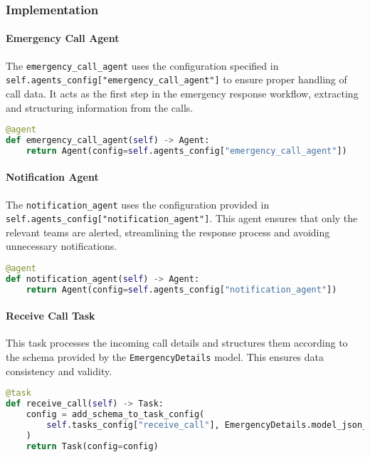 \subsubsection{Implementation}

\paragraph{Emergency Call Agent}
The \texttt{emergency\_call\_agent} uses the configuration specified in \newline \texttt{self.agents\_config["emergency\_call\_agent"]} to ensure proper handling of call data. It acts as the first step in the emergency response workflow, extracting and structuring information from the calls.

\begin{lstlisting}[language=Python]
@agent
def emergency_call_agent(self) -> Agent:
    return Agent(config=self.agents_config["emergency_call_agent"])
\end{lstlisting}

\paragraph{Notification Agent}
The \texttt{notification\_agent} uses the configuration provided in \newline \texttt{self.agents\_config["notification\_agent"]}. This agent ensures that only the relevant teams are alerted, streamlining the response process and avoiding unnecessary notifications.

\begin{lstlisting}[language=Python]
@agent
def notification_agent(self) -> Agent:
    return Agent(config=self.agents_config["notification_agent"])
\end{lstlisting}


\paragraph{Receive Call Task}
This task processes the incoming call details and structures them according to the schema provided by the \texttt{EmergencyDetails} model. This ensures data consistency and validity.

\begin{lstlisting}[language=Python]
@task
def receive_call(self) -> Task:
    config = add_schema_to_task_config(
        self.tasks_config["receive_call"], EmergencyDetails.model_json_schema()
    )
    return Task(config=config)
\end{lstlisting}

